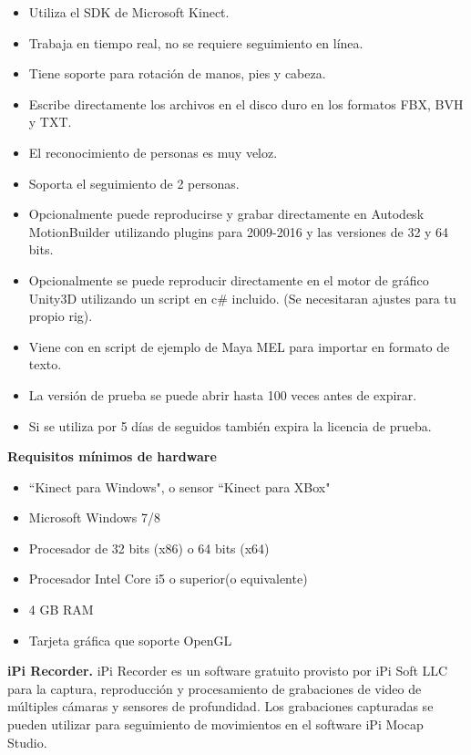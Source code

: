 \begin{itemize} \itemsep1pt \parskip0pt 
	\item Utiliza el SDK de Microsoft Kinect. 
	\item Trabaja en tiempo real, no se requiere seguimiento en línea.
	\item Tiene soporte para rotación de manos, pies y cabeza.
	\item Escribe directamente los archivos en el disco duro en los formatos FBX, BVH y TXT.
	\item El reconocimiento de personas es muy veloz.
	\item Soporta el seguimiento de 2 personas.
	\item Opcionalmente puede reproducirse y grabar directamente en Autodesk MotionBuilder utilizando plugins para 2009-2016 y las versiones de 32 y 64 bits.
	\item Opcionalmente se puede reproducir directamente en el motor de gráfico Unity3D utilizando un script en c\# incluido. (Se necesitaran ajustes para tu propio rig).
	\item Viene con en script de ejemplo de  Maya MEL para importar en formato de texto.
	\item La versión de prueba se puede abrir hasta 100 veces antes de expirar.
	\item Si se utiliza por 5 días de seguidos también expira la licencia de prueba.
\end{itemize}
	
\textbf{Requisitos mínimos de hardware}

\begin{itemize} \itemsep1pt \parskip0pt 
	\item ``Kinect para Windows", o sensor ``Kinect para XBox"
	\item Microsoft Windows 7/8
	\item Procesador de 32 bits (x86) o 64 bits (x64)
	\item Procesador Intel Core i5 o superior(o equivalente)
	\item 4 GB RAM
	\item Tarjeta gráfica que soporte OpenGL
\end{itemize}

\textbf{iPi Recorder.} iPi Recorder es un software gratuito provisto por iPi Soft LLC para la captura, reproducción y procesamiento de grabaciones de video de múltiples cámaras y sensores de profundidad. Los grabaciones capturadas se pueden utilizar para seguimiento de movimientos en el software iPi Mocap Studio. \cite{iPi}\\

